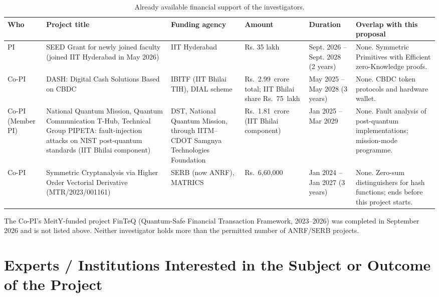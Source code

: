 \begin{table}[htbp]
\centering\small
\begin{tabular}{@{}p{1cm}p{4cm}p{3.5cm}p{1.9cm}p{2.2cm}p{2.5cm}@{}}
\toprule
\textbf{Who} & \textbf{Project title} & \textbf{Funding agency} & \textbf{Amount} & \textbf{Duration} & \textbf{Overlap with this proposal} \\
\midrule
PI & SEED Grant for newly joined faculty (joined IIT Hyderabad in May 2026) & IIT Hyderabad & Rs. 35 lakh & Sept. 2026 -- Sept. 2028 (2 years) & None. Symmetric Primitives with Efficient zero-Knowledge proofs.\\
\addlinespace
Co-PI & DASH: Digital Cash Solutions Based on CBDC & IBITF (IIT Bhilai TIH), DIAL scheme & Rs.~2.99~crore total; IIT Bhilai share Rs.~75~lakh & May 2025 -- May 2028 (3 years) & None. CBDC token protocols and hardware wallet. \\
\addlinespace
Co-PI (Member PI) & National Quantum Mission, Quantum Communication T-Hub, Technical Group PIPETA: fault-injection attacks on NIST post-quantum standards (IIT Bhilai component) & DST, National Quantum Mission, through IITM--CDOT Samgnya Technologies Foundation & Rs.~1.81~crore (IIT Bhilai component) & Jan 2025 -- Mar 2029 & None. Fault analysis of post-quantum implementations; mission-mode programme. \\
\addlinespace
Co-PI & Symmetric Cryptanalysis via Higher Order Vectorial Derivative (MTR/2023/001161) & SERB (now ANRF), MATRICS & Rs.~6,60,000 & Jan 2024 -- Jan 2027 (3 years) & None. Zero-sum distinguishers for hash functions; ends before this project starts. \\
\bottomrule
\end{tabular}
\caption{Already available financial support of the investigators.}
\label{tab:fin}
\end{table}

\noindent
The Co-PI's MeitY-funded project FinTeQ (Quantum-Safe Financial Transaction Framework, 2023--2026) was completed in September 2026 and is not listed above.
Neither investigator holds more than the permitted number of ANRF/SERB projects.

\section{Experts / Institutions Interested in the Subject or Outcome of the Project}

